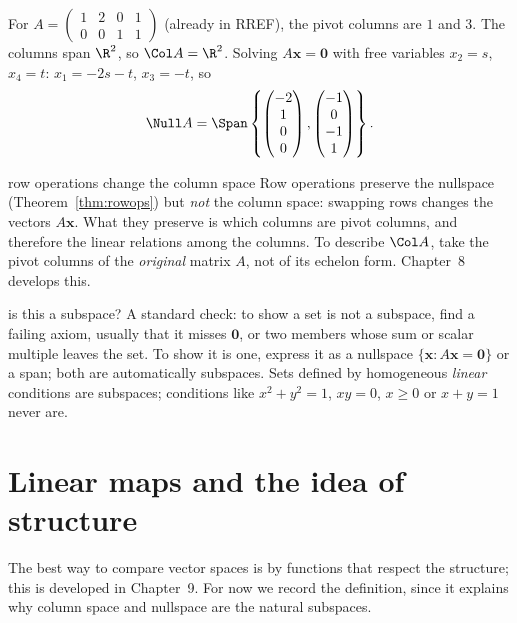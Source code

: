 \begin{example}
For $A=\begin{pmatrix}1&2&0&1\\0&0&1&1\end{pmatrix}$ (already in RREF), the pivot columns are $1$ and $3$. The columns span $\R^2$, so $\Col A=\R^2$. Solving $A\mathbf{x}=\mathbf{0}$ with free variables $x_2=s$, $x_4=t$: $x_1=-2s-t$, $x_3=-t$, so
\[ \Null A=\Span\left\{\begin{pmatrix}-2\\1\\0\\0\end{pmatrix},\begin{pmatrix}-1\\0\\-1\\1\end{pmatrix}\right\}. \]
\end{example}

\begin{nuance}{row operations change the column space}
Row operations preserve the nullspace (Theorem~\ref{thm:rowops}) but \emph{not} the column space: swapping rows changes the vectors $A\mathbf{x}$. What they preserve is which columns are pivot columns, and therefore the linear relations among the columns. To describe $\Col A$, take the pivot columns of the \emph{original} matrix $A$, not of its echelon form. Chapter~8 develops this.
\end{nuance}

\begin{interview}{is this a subspace?}
A standard check: to show a set is not a subspace, find a failing axiom, usually that it misses $\mathbf{0}$, or two members whose sum or scalar multiple leaves the set. To show it is one, express it as a nullspace $\{\mathbf{x}:A\mathbf{x}=\mathbf{0}\}$ or a span; both are automatically subspaces. Sets defined by homogeneous \emph{linear} conditions are subspaces; conditions like $x^2+y^2=1$, $xy=0$, $x\ge0$ or $x+y=1$ never are.
\end{interview}

\section{Linear maps and the idea of structure}

The best way to compare vector spaces is by functions that respect the structure; this is developed in Chapter~9. For now we record the definition, since it explains why column space and nullspace are the natural subspaces.

